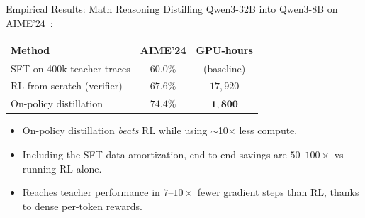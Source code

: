 \begin{frame}{Empirical Results: Math Reasoning}
  Distilling Qwen3-32B into Qwen3-8B on AIME'24~\cite{thinkingmachines2025distillation}:

  \vspace{0.4em}
  \begin{center}
  \renewcommand{\arraystretch}{1.15}
  \begin{tabular}{l c c}
    \toprule
    \textbf{Method} & \textbf{AIME'24} & \textbf{GPU-hours} \\
    \midrule
    SFT on 400k teacher traces            & $60.0\%$  & (baseline)        \\
    RL from scratch (verifier)            & $67.6\%$  & $17{,}920$        \\
    \rowcolor{green!10}
    On-policy distillation                & $\mathbf{74.4\%}$ & $\mathbf{1{,}800}$ \\
    \bottomrule
  \end{tabular}
  \end{center}

  \vspace{0.3em}
  \begin{itemize}[nosep]
    \item On-policy distillation \emph{beats} RL while using $\sim$10$\times$ less compute.
    \item Including the SFT data amortization, end-to-end savings are $50$--$100\times$ vs running RL alone.
    \item Reaches teacher performance in $7$--$10\times$ fewer gradient steps than RL, thanks to dense per-token rewards.
  \end{itemize}
\end{frame}

